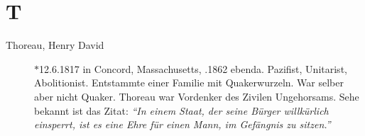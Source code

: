 \section*{T}

\articlesize

\begin{description}

    
 \item[Thoreau, Henry David] $\ast$12.6.1817 in Concord, Massachusetts, .1862 ebenda. Pazifist, Unitarist, Abolitionist. Entstammte einer Familie mit Quakerwurzeln. War selber aber nicht Quaker. Thoreau war Vordenker des Zivilen Ungehorsams. Sehe bekannt ist das Zitat: \textit{"`In einem Staat, der seine Bürger willkürlich einsperrt, ist es eine Ehre für einen Mann, im Gefängnis zu sitzen."'}


 \end{description}

\normalsize
